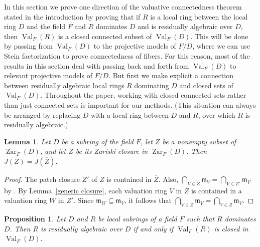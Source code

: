 \documentclass[preprint, 11pt,nonatbib]{elsarticle}
\DeclareMathOperator{\Dom}{Val}
\DeclareMathOperator{\Zar}{Zar}
\newtheorem{proposition}[theorem]{Proposition}
\newtheorem{lemma}[theorem]{Lemma}
\theoremstyle{definition}
\numberwithin{theorem}{section}
\begin{document}
In this section we prove one direction of  the valuative connectedness theorem stated in the introduction by proving that if $R$ is a local ring between the local ring $D$ and the field $F$ and $R$ dominates $D$ and is residually algebraic over $D$, then $\Dom_F(R)$ is a closed connected subset of $\Dom_F(D)$.  
This will be done by passing from $\Dom_F(D)$ to the projective models of $F/D$, where we can use Stein factorization to prove connectedness of fibers. 
For this reason, most of the results in this section deal with passing back and forth from $\Dom_F(D)$ to  relevant projective models of $F/D$. 
But first we make explicit a connection between residually algebraic local rings $R$ dominating $D$ and closed sets of $\Dom_F(D)$. Throughout the paper, working with closed connected sets rather than just connected sets is important for our methods. (This situation can always be arranged by replacing $D$ with a local ring between $D$ and $R$, over which $R$ is residually algebraic.)  



\begin{lemma} \label{J lemma} Let $D$ be a subring of the field $F$,  let $Z$ be a nonempty subset of $\Zar_F(D)$, and let $\overline{Z}$ be its Zariski closure in $\Zar_F(D)$.   Then $J(Z) = J(\overline{Z})$. 
\end{lemma}

\begin{proof}
 The patch closure $Z'$ of $Z$ is contained in $\overline{Z}$. Also, $\bigcap_{V \in Z}{\mathfrak{m}}_V = \bigcap_{V \in Z'}{\mathfrak{m}}_V$ by \cite[Lemma 2.3(1)]{MR3686983}. By Lemma~\ref{generic closure}, each valuation ring $V$ in $\overline{Z}$ is contained in a valuation ring $W$ in $Z'$. Since ${\mathfrak{m}}_W \subseteq  {\mathfrak{m}}_V$, it follows that $\bigcap_{V \in Z}{\mathfrak{m}}_V = \bigcap_{V \in \overline{Z}}{\mathfrak{m}}_V$. 
\end{proof}

\begin{proposition} \label{RA lemma} Let $D$ and $R$ be local subrings of
a field $F$ such that $R$  dominates $D$. 
Then $R$ is residually algebraic over $D$ if and only if $\Dom_F(R)$ is closed in $\Dom_F(D)$.
%
\end{proposition} 
\end{document}
